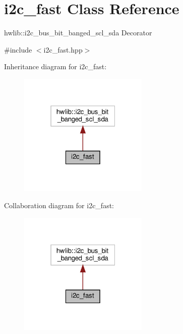 \hypertarget{classi2c__fast}{}\section{i2c\+\_\+fast Class Reference}
\label{classi2c__fast}


hwlib\+::i2c\+\_\+bus\+\_\+bit\+\_\+banged\+\_\+scl\+\_\+sda Decorator  




{\ttfamily \#include $<$i2c\+\_\+fast.\+hpp$>$}



Inheritance diagram for i2c\+\_\+fast\+:
\nopagebreak
\begin{figure}[H]
\begin{center}
\leavevmode
\includegraphics[width=175pt]{classi2c__fast__inherit__graph}
\end{center}
\end{figure}


Collaboration diagram for i2c\+\_\+fast\+:
\nopagebreak
\begin{figure}[H]
\begin{center}
\leavevmode
\includegraphics[width=175pt]{classi2c__fast__coll__graph}
\end{center}
\end{figure}
